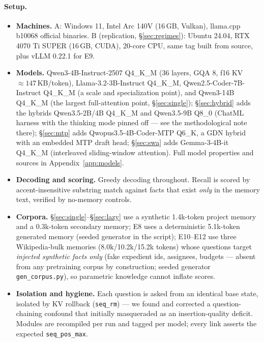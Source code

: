 \documentclass[11pt]{article}
\newcommand{\code}[1]{\texttt{#1}}
\begin{document}
\paragraph{Setup.}
\begin{itemize}
  \item \textbf{Machines.} A: Windows 11, Intel Arc 140V (16\,GB, Vulkan), llama.cpp b10068 official binaries. B (replication, \S\ref{sec:regimes}): Ubuntu 24.04, RTX 4070 Ti SUPER (16\,GB, CUDA), 20-core CPU, same tag built from source, plus vLLM 0.22.1 for E9.
  \item \textbf{Models.} Qwen3-4B-Instruct-2507 Q4\_K\_M (36 layers, GQA 8, f16 KV $\approx 147$\,KB/token), Llama-3.2-3B-Instruct Q4\_K\_M, Qwen2.5-Coder-7B-Instruct Q4\_K\_M (a scale and specialization point), and Qwen3-14B Q4\_K\_M (the largest full-attention point, \S\ref{sec:single}); \S\ref{sec:hybrid} adds the hybrids Qwen3.5-2B/4B Q4\_K\_M and Qwen3.5-9B Q8\_0 (ChatML harness with the thinking mode pinned off --- see the methodological note there); \S\ref{sec:mtp} adds Qwopus3.5-4B-Coder-MTP Q6\_K, a GDN hybrid with an embedded MTP draft head; \S\ref{sec:swa} adds Gemma-3-4B-it Q4\_K\_M (interleaved sliding-window attention). Full model properties and sources in Appendix~\ref{app:models}.
  \item \textbf{Decoding and scoring.} Greedy decoding throughout. Recall is scored by accent-insensitive substring match against facts that exist \emph{only} in the memory text, verified by no-memory controls.
  \item \textbf{Corpora.} \S\ref{sec:single}--\S\ref{sec:lazy} use a synthetic 1.4k-token project memory and a 0.3k-token secondary memory; E8 uses a deterministic 5.1k-token generated memory (seeded generator in the script); E10--E12 use three Wikipedia-bulk memories (8.0k/10.2k/15.2k tokens) whose questions target \emph{injected synthetic facts only} (fake expedient ids, assignees, budgets --- absent from any pretraining corpus by construction; seeded generator \code{gen\_corpus.py}), so parametric knowledge cannot inflate scores.
  \item \textbf{Isolation and hygiene.} Each question is asked from an identical base state, isolated by KV rollback (\code{seq\_rm}) --- we found and corrected a question-chaining confound that initially masqueraded as an insertion-quality deficit. Modules are recompiled per run and tagged per model; every link asserts the expected \code{seq\_pos\_max}.
\end{itemize}
\end{document}
